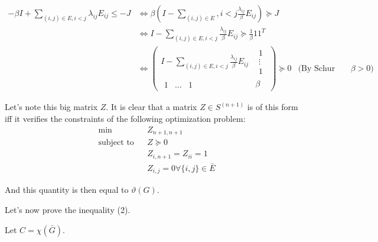 \documentclass[11pt]{article}
\begin{document}
\begin{align*}
-\beta I + \sum_{(i,j) \in E, i < j} \lambda_{ij} E_{ij} \le -J
&\iff \beta(I - \sum_{(i,j) \in E}, i < j \frac{\lambda_{ij}}{\beta} E_{ij}) \succeq J
\\&\iff I - \sum_{(i,j) \in E, i < j} \frac{\lambda_{ij}}{\beta} E_{ij}  \succeq \frac1\beta 11^T
\\&\iff \begin{pmatrix}I - \sum_{(i,j) \in E, i < j} \frac{\lambda_{ij}}{\beta} E_{ij} & \begin{matrix}1\\\vdots\\1\end{matrix}\\
 \begin{matrix}1&\ldots&1\end{matrix}&\beta\end{pmatrix}  \succeq 0 &\text{(By Schur Lemma bc $\beta > 0$)}
\end{align*}


Let's note this big matrix \(Z\). It is clear that a matrix \(Z \in S^{(n+1)}\) is of this form iff it verifies the constraints of the following optimization problem:
\begin{align*}
& \min
& & Z_{n+1, n+1} \\
& \text{subject to}
& & Z  \succeq 0
\\&&& Z_{i,n+1} = Z_{ii} = 1
\\&&& Z_{i,j} = 0 \forall \{i, j\} \in \bar E
\end{align*}

And this quantity is then equal to \(\vartheta(G)\).

Let's now prove the inequality (2).

Let \(C = \chi(\bar G)\).
\end{document}
